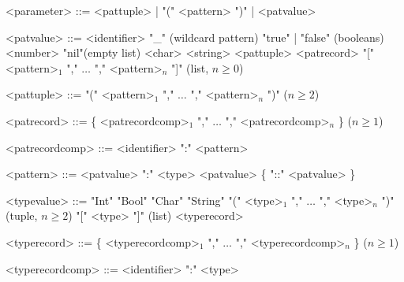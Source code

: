 \documentclass{article}
\begin{document}
\begin{grammar}
  <parameter> ::= <pattuple> \textvisiblespace | "(" \textvisiblespace <pattern> ")" \textvisiblespace | <patvalue> \textvisiblespace
\end{grammar}

\begin{grammar}
  <patvalue> ::= <identifier>
  \alt "_" \hfill (wildcard pattern)
  \alt "true" | "false" \hfill (booleans)
  \alt <number>
  \alt "nil"\hfill (empty list)
  \alt <char>
  \alt <string>
  \alt <pattuple>
  \alt <patrecord>
  \alt "[" \textvisiblespace <pattern>$_1$ "," \textvisiblespace $\ldots$ "," \textvisiblespace <pattern>$_n$ "]" \textvisiblespace \hfill (list, $n \geq 0$)
\end{grammar}

\begin{grammar}
  <pattuple> ::= "(" \textvisiblespace <pattern>$_1$ "," \textvisiblespace $\ldots$ "," \textvisiblespace <pattern>$_n$ ")" \textvisiblespace \hfill ($n \geq 2$)
\end{grammar}

\begin{grammar}
  <patrecord> ::= \{ \textvisiblespace <patrecordcomp>$_1$ "," \textvisiblespace $\ldots$ "," \textvisiblespace <patrecordcomp>$_n$ \} \textvisiblespace \hfill ($n \geq 1$)

  <patrecordcomp> ::= <identifier> \textvisiblespace ":" \textvisiblespace <pattern>
\end{grammar}

\begin{grammar}
  <pattern> ::= <patvalue> \textvisiblespace ":" \textvisiblespace <type>
  \alt <patvalue> \textvisiblespace \{ "::" \textvisiblespace <patvalue> \textvisiblespace \}
\end{grammar}

\begin{grammar}
  <typevalue> ::= "Int"
  \alt "Bool"
  \alt "Char"
  \alt "String"
  \alt "(" \textvisiblespace <type>$_1$ "," \textvisiblespace $\ldots$ "," \textvisiblespace <type>$_n$ ")" \textvisiblespace \hfill (tuple, $n \geq 2$)
  \alt "[" \textvisiblespace <type> \textvisiblespace "]" \textvisiblespace \hfill (list)
  \alt <typerecord>
\end{grammar}

\begin{grammar}
  <typerecord> ::= \{ \textvisiblespace <typerecordcomp>$_1$ "," \textvisiblespace $\ldots$ "," \textvisiblespace <typerecordcomp>$_n$ \} \textvisiblespace \hfill ($n \geq 1$)

  <typerecordcomp> ::= <identifier> \textvisiblespace ":" \textvisiblespace <type>
\end{grammar}
\end{document}
